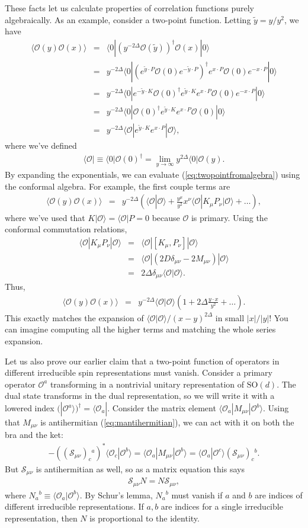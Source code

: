 \documentclass{ws-rv9x6}
\newcommand\be{\begin{eqnarray}}
\newcommand\ee{\end{eqnarray}}
\newcommand\cO{\mathcal{O}}
\newcommand\p[1]{\left(#1\right)}
\newcommand\<\langle
\renewcommand\>\rangle
\newcommand\de\delta
\newcommand\nn{\nonumber}
\renewcommand\.{\cdot}
\newcommand\SO{\mathrm{SO}}
\newcommand\De{\Delta}
\newcommand\cS{\mathcal{S}}
\newcommand\oo\infty
\newcommand\tl[1]{\widetilde{#1}}
\begin{document}
These facts let us calculate properties of correlation functions purely algebraically.  As an example, consider a two-point function.  Letting $\tl y = y/y^2$, we have
\be
\<\cO(y)\cO(x)\> &=& \<0|(y^{-2\De}\cO(\tl y))^\dag \cO(x)|0\>\nn\\
&=& y^{-2\De}\<0|(e^{\tl y\.P}\cO(0)e^{-\tl y\.P})^\dag e^{x\.P}\cO(0)e^{-x\.P}|0\>\nn\\
&=& y^{-2\De}\<0|e^{-\tl y\.K}\cO(0)^\dag e^{\tl y\.K} e^{x\.P}\cO(0)e^{-x\.P}|0\>\nn\\
&=& y^{-2\De}\<0|\cO(0)^\dag e^{\tl y\.K} e^{x\.P}\cO(0) |0\>\nn\\
&=& y^{-2\De}\<\cO|e^{\tl y\.K} e^{x\.P}|\cO\>,
\label{eq:twopointfromalgebra}
\ee
where we've defined
\be
\<\cO| \equiv \<0|\cO(0)^\dag = \lim_{y\to \oo} y^{2\De} \<0|\cO(y).
\ee
By expanding the exponentials, we can evaluate (\ref{eq:twopointfromalgebra}) using the conformal algebra.  For example, the first couple terms are
\be
\<\cO(y)\cO(x)\> &=& y^{-2\De}\p{\<\cO|\cO\> + \frac{y^\mu}{y^2}x^\nu\<\cO|K_\mu P_\nu|\cO\>+\dots},
\ee
where we've used that $K|\cO\>=\<\cO|P=0$ because $\cO$ is primary.  Using the conformal commutation relations,
\be
\<\cO|K_\mu P_\nu|\cO\> &=& \<\cO|[K_\mu,P_\nu]|\cO\>\nn\\
&=& \<\cO|(2D\de_{\mu\nu}-2M_{\mu\nu})|\cO\>\nn\\
&=& 2\De\de_{\mu\nu}\<\cO|\cO\>.
\label{eq:normoffirstdescendant}
\ee
Thus,
\be
\<\cO(y)\cO(x)\> &=& y^{-2\De} \<\cO|\cO\>\p{1 + 2\De\frac{y\.x}{y^2}+\dots}.
\ee
This exactly matches the expansion of $\<\cO|\cO\>/(x-y)^{2\De}$ in small $|x|/|y|$!  You can imagine computing all the higher terms and matching the whole series expansion.

Let us also prove our earlier claim that a two-point function of operators in different irreducible spin representations must vanish.  Consider a primary operator $\cO^a$ transforming in a nontrivial unitary representation of $\SO(d)$. The dual state transforms in the dual representation, so we will write it with a lowered index $(|\cO^a\>)^\dag=\<\cO_a|$.  Consider the matrix element $\<\cO_a|M_{\mu\nu}|\cO^b\>$.  Using that $M_{\mu\nu}$ is antihermitian (\ref{eq:mantihermitian}), we can act with it on both the bra and the ket:
\begin{align}
-((\cS_{\mu\nu})_c{}^a)^*\<\cO_c|\cO^b\> = \<\cO_a|M_{\mu\nu}|\cO^b\> = \<\cO_a|\cO^c\>(\cS_{\mu\nu})_c{}^b.
\end{align}
But $\cS_{\mu\nu}$ is antihermitian as well, so as a matrix equation this says
\be
\cS_{\mu\nu}N=N \cS_{\mu\nu},
\ee
where $N_a{}^b\equiv\<\cO_a|\cO^b\>$.  By Schur's lemma, $N_a{}^b$ must vanish if $a$ and $b$ are indices of different irreducible representations.  If $a,b$ are indices for a single irreducible representation, then $N$ is proportional to the identity.
\end{document}

